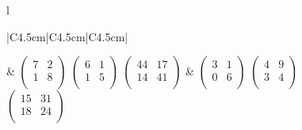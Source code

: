 \begin{przyklad}
\begin{figure}[H]
\begin{tabular}{l}
\begin{tabular}{|C{4.5cm}|C{4.5cm}|C{4.5cm}|}
\begin{pmatrix}
\end{pmatrix}\) &
\(\begin{pmatrix}
        7 & 2 \\
        1 & 8 \\    
\end{pmatrix}\)
\(\begin{pmatrix}
        6 & 1 \\
        1 & 5 \\    
\end{pmatrix}\) 
\(\begin{pmatrix}
        44 & 17 \\
        14 & 41 \\    
\end{pmatrix}\) &
\(\begin{pmatrix}
        3 & 1 \\
        0 & 6 \\    
\end{pmatrix}\)
\(\begin{pmatrix}
        4 & 9 \\
        3 & 4 \\    
\end{pmatrix}\) 
\(\begin{pmatrix}
        15 & 31 \\
        18 & 24 \\    
\end{pmatrix}\) \\
\hline
\end{tabular} 
\end{tabular}
\vspace{0.5cm}










\end{figure}
\end{przyklad}
